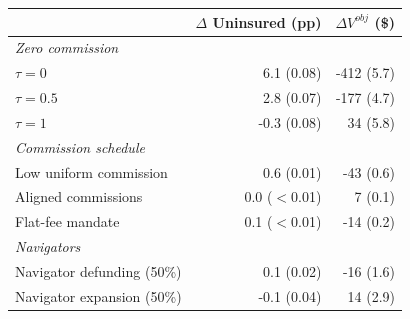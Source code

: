 \begin{tabular}{lrr}
\hline\hline
 & $\Delta$ Uninsured (pp) & $\Delta V^{obj}$ (\$) \\
\hline
\multicolumn{3}{l}{\emph{Zero commission}} \\
\quad $\tau = 0$ & 6.1 (0.08) & -412 (5.7) \\
\quad $\tau = 0.5$ & 2.8 (0.07) & -177 (4.7) \\
\quad $\tau = 1$ & -0.3 (0.08) & 34 (5.8) \\
\multicolumn{3}{l}{\emph{Commission schedule}} \\
\quad Low uniform commission & 0.6 (0.01) & -43 (0.6) \\
\quad Aligned commissions & 0.0 ($<$0.01) & 7 (0.1) \\
\quad Flat-fee mandate & 0.1 ($<$0.01) & -14 (0.2) \\
\multicolumn{3}{l}{\emph{Navigators}} \\
\quad Navigator defunding (50\%) & 0.1 (0.02) & -16 (1.6) \\
\quad Navigator expansion (50\%) & -0.1 (0.04) & 14 (2.9) \\
\hline\hline
\end{tabular}
